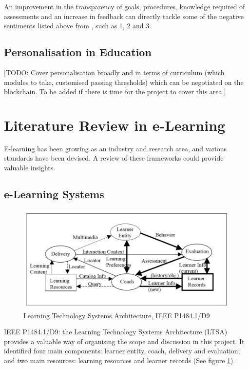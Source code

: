 An improvement in the transparency of goals, procedures, knowledge required of assessments and an increase 
in feedback can directly tackle some of the negative sentiments listed above from \citet{brown1999assessment}, 
such as 1, 2 and 3.

\subsection{Personalisation in Education}

[TODO: Cover personalisation broadly and in terms of curriculum (which modules to take, 
customised passing thresholds) which can be negotiated on the blockchain.
To be added if there is time for the project to cover this area.]

\section{Literature Review in e-Learning}

E-learning has been growing as an industry and research area, and various standards have been devised. 
A review of these frameworks could provide valuable insights.

\subsection{e-Learning Systems}

\begin{figure}[!ht] 
    \centering    
    \includegraphics[width=1.0\textwidth]{LTSA}
    \caption[Learning Technology Systems Architecture]
        {Learning Technology Systems Architecture, IEEE P1484.1/D9 \citep{farance1999learning}}
    \label{fig:LTSA}
\end{figure}

IEEE P1484.1/D9: the Learning Technology Systems Architecture (LTSA) provides a valuable way of organising 
the scope and discussion in this project. It identified four main components: learner entity, coach, 
delivery and evaluation; and two main resources: learning resources and learner records (See figure \ref{fig:LTSA}).

